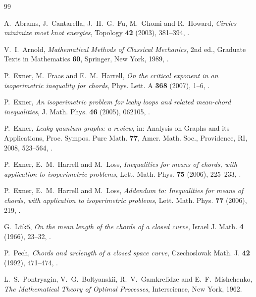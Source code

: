 \documentclass[11pt]{amsart}
\theoremstyle{definition}
\theoremstyle{remark}
\begin{document}
\begin{thebibliography}{99}

 A.~Abrams, J.~Cantarella, J.~H.~G.~Fu, M.~Ghomi and R.~Howard, \emph{Circles minimize most knot energies}, Topology \textbf{42} (2003), 381--394, .

 V.~I.~Arnold, \emph{Mathematical Methods of Classical Mechanics}, 2nd ed., Graduate Texts in Mathematics \textbf{60}, Springer, New York, 1989, .

 P.~Exner, M.~Fraas and E.~M.~Harrell, \emph{On the critical exponent in an isoperimetric inequality for chords}, Phys. Lett. A \textbf{368} (2007), 1--6, .

 P.~Exner, \emph{An isoperimetric problem for leaky loops and related mean-chord inequalities}, J. Math. Phys. \textbf{46} (2005), 062105, .

 P.~Exner, \emph{Leaky quantum graphs: a review}, in: Analysis on Graphs and its Applications, Proc. Sympos. Pure Math. \textbf{77}, Amer. Math. Soc., Providence, RI, 2008, 523--564, .

 P.~Exner, E.~M.~Harrell and M.~Loss, \emph{Inequalities for means of chords, with application to isoperimetric problems}, Lett. Math. Phys. \textbf{75} (2006), 225--233, .

 P.~Exner, E.~M.~Harrell and M.~Loss, \emph{Addendum to: Inequalities for means of chords, with application to isoperimetric problems}, Lett. Math. Phys. \textbf{77} (2006), 219, .

 G.~Lük\H{o}, \emph{On the mean length of the chords of a closed curve}, Israel J. Math. \textbf{4} (1966), 23--32, .

 P.~Pech, \emph{Chords and arclength of a closed space curve}, Czechoslovak Math. J. \textbf{42} (1992), 471--474, .

 L.~S.~Pontryagin, V.~G.~Boltyanskii, R.~V.~Gamkrelidze and E.~F.~Mishchenko, \emph{The Mathematical Theory of Optimal Processes}, Interscience, New York, 1962.

\end{thebibliography}
\end{document}
